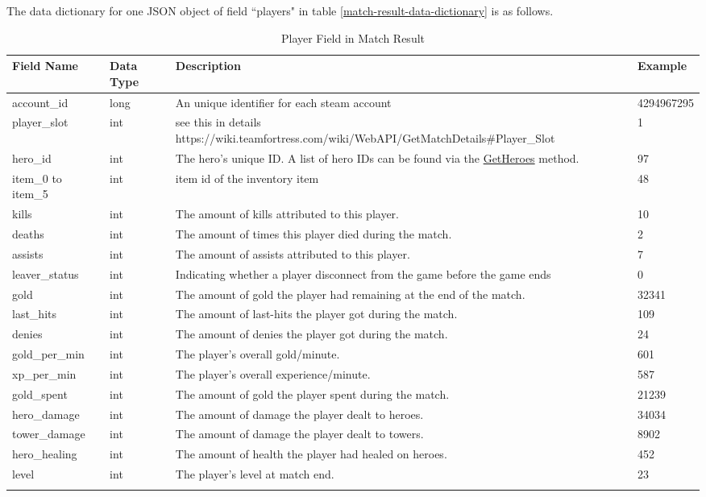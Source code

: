 \documentclass{article}
\begin{document}
The data dictionary for one JSON object of field ``players" in table \ref{match-result-data-dictionary} is as follows.

\begin{longtable}{|p{2.5cm}|p{2cm}|p{5.5cm}|p{3cm}|}

\hline
\textbf{Field Name} & \textbf{Data Type} & \textbf{Description}  & \textbf{Example} \\
\hline
\endhead

account\_id & long & An unique identifier for each steam account & 4294967295 \\
\hline
player\_slot & int & see this in details https://wiki.teamfortress.com/wiki/WebAPI/GetMatchDetails\#Player\_Slot & 1 \\
\hline
hero\_id & int & The hero's unique ID. A list of hero IDs can be found via the \href{https://wiki.teamfortress.com/wiki/WebAPI/GetHeroes}{GetHeroes} method. & 97 \\
\hline
item\_0 to item\_5 & int & item id of the inventory item & 48 \\
\hline
kills & int & The amount of kills attributed to this player. & 10 \\
\hline
deaths & int & The amount of times this player died during the match. & 2 \\
\hline
assists & int & The amount of assists attributed to this player. & 7 \\
\hline
leaver\_status & int & Indicating whether a player disconnect from the game before the game ends & 0 \\
\hline
gold & int & The amount of gold the player had remaining at the end of the match. & 32341 \\
\hline
last\_hits & int & The amount of last-hits the player got during the match. & 109 \\
\hline
denies & int & The amount of denies the player got during the match. & 24 \\
\hline
gold\_per\_min & int &  The player's overall gold/minute. & 601 \\
\hline
xp\_per\_min & int & The player's overall experience/minute. & 587 \\
\hline
gold\_spent & int & The amount of gold the player spent during the match. & 21239 \\
\hline
hero\_damage & int & The amount of damage the player dealt to heroes. & 34034 \\
\hline
tower\_damage & int & The amount of damage the player dealt to towers. & 8902 \\
\hline
hero\_healing & int & The amount of health the player had healed on heroes. & 452 \\
\hline
level & int & The player's level at match end. & 23 \\
\hline
\caption{Player Field in Match Result}
\label{player-field-in-match-result}
\end{longtable}
\end{document}
